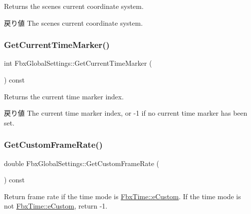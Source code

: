 Returns the scene\textquotesingle{}s current coordinate system. \begin{DoxyReturn}{戻り値}
The scene\textquotesingle{}s current coordinate system. 
\end{DoxyReturn}
\mbox{\label{class_fbx_global_settings_a9b73e19550f3df6eb83743e70a6f36d5}} 
\subsubsection{\texorpdfstring{Get\+Current\+Time\+Marker()}{GetCurrentTimeMarker()}}
{\footnotesize\ttfamily int Fbx\+Global\+Settings\+::\+Get\+Current\+Time\+Marker (\begin{DoxyParamCaption}{ }\end{DoxyParamCaption}) const}

Returns the current time marker index. \begin{DoxyReturn}{戻り値}
The current time marker index, or -\/1 if no current time marker has been set. 
\end{DoxyReturn}
\mbox{\label{class_fbx_global_settings_a70888edefedf6502041a00f0751e2f11}} 
\subsubsection{\texorpdfstring{Get\+Custom\+Frame\+Rate()}{GetCustomFrameRate()}}
{\footnotesize\ttfamily double Fbx\+Global\+Settings\+::\+Get\+Custom\+Frame\+Rate (\begin{DoxyParamCaption}{ }\end{DoxyParamCaption}) const}

Return frame rate if the time mode is \hyperlink{class_fbx_time_acc529b00a0e8d4c3da3702449ca93031afb5f0e69ae6545d1d0efa35400a69a13}{Fbx\+Time\+::e\+Custom}. If the time mode is not \hyperlink{class_fbx_time_acc529b00a0e8d4c3da3702449ca93031afb5f0e69ae6545d1d0efa35400a69a13}{Fbx\+Time\+::e\+Custom}, return -\/1. \mbox{\label{class_fbx_global_settings_a7a173e83989d4256dbcfc48b72c07655}} 
